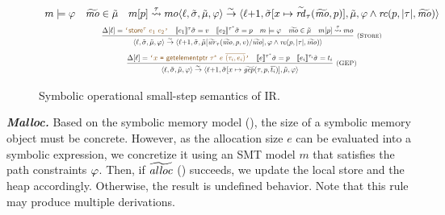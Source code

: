 \begin{figure}[t]
\[\begin{array}{c}
{  m \models \pc \quad
  \symmo \in \symmemory \quad
  \symisinbounds{p}{\tau}{mo}{m}
}
{
  \symstate{\location}{\symlocalstore}{\symstack}{\symmemory}{\pc}
  \symstep
  \symstate{\nextinstr{\location}}{\symlocalstore[x \mapsto \symmoread{\tau}{\symmo}{p}]}{\symstack}{\symmemory}{\pc \land \rangecond(p, |\tau|, \symmo)}
}
\\[5pt]
\ruledefsmall{Store}{
  \instrat{\location} = \codequote{\tstore^{\tau}~e_1~e_2} \quad
  \evalexprty{e_1}{\symlocalstore}{\tau} = v \quad
  \evalexprty{e_2}{\symlocalstore}{\pointertypeof{\tau}} = p \quad
  m \models \pc \quad
  \symmo \in \symmemory \quad
  \symisinbounds{p}{\tau}{mo}{m}
}
{
  \symstate{\location}{\symlocalstore}{\symstack}{\symmemory}{\pc}
  \symstep
  \symstate{\nextinstr{\location}}{\symlocalstore}{\symstack}{\symheapreplace{\symmemory}{\symmo}{\symmowrite{\tau}{\symmo}{p}{v}}}{\pc \land \rangecond(p, |\tau|, \symmo)}
}
\\[5pt]
\ruledefsmall{GEP}{
  \instrat{\location} = \codequote{x~\texttt{=}~\tgep~\pointertypeof{\tau}~e~\overline{(\tau_i, e_i)}} \quad
  \evalexprty{e}{\symlocalstore}{\pointertypeof{\tau}} = p \quad
  \evalexprty{e_i}{\symlocalstore}{\tau_i} = t_i
}
{
  \symstate{\location}{\symlocalstore}{\symstack}{\symmemory}{\pc}
  \symstep
  \symstate{\nextinstr{\location}}{\symlocalstore[x \mapsto \symevalgep(\tau, p, \overline{t_i})]}{\symstack}{\symmemory}{\pc}
}
\end{array}
\]
\caption{Symbolic operational small-step semantics of \llvm IR.}
\label{figure:symbolic-semantics}
\end{figure}


%

\textbf{\textit{Malloc.}}
Based on the symbolic memory model (),
the size of a symbolic memory object must be concrete.
However, as the allocation size $e$ can be evaluated into a symbolic expression,
we concretize it using an SMT model $m$ that satisfies the path constraints $\varphi$.
Then, if $\widetilde{\mathit{alloc}}$ () succeeds,
we update the local store and the heap accordingly.
Otherwise, the result is undefined behavior.
Note that this rule may produce multiple derivations.


